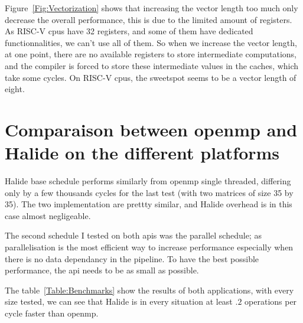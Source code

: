	Figure~\ref{Fig:Vectorization} shows that increasing the vector length too much only decrease the overall performance, this is due to the limited amount of registers. As RISC-V \glspl{cpu} have 32 registers, and some of them have dedicated functionnalities, we can't use all of them.
	So when we increase the vector length, at one point, there are no available registers to store intermediate computations, and the compiler is forced to store these intermediate values in the caches, which take some  cycles.
	On RISC-V \glspl{cpu}, the sweetspot seems to be a vector length of eight.







\section{Comparaison between \acrshort{openmp} and Halide on the different platforms}



	Halide base schedule performs similarly from \gls{openmp} single threaded, differing only by a few thousands cycles for the last test (with two matrices of size 35 by 35).
	The two implementation are prettty similar, and Halide overhead is in this case almost negligeable.

	The second schedule I tested on both \glspl{api} was the parallel schedule; as parallelisation is the most efficient way to increase performance especially when there is no data dependancy in the pipeline. To have the best possible performance, the \gls{api} needs to be as small as possible.

	The table~\ref{Table:Benchmarks} show the results of both applications, with every size tested, we can see that Halide is in every situation at least $.2$ operations per cycle faster than \gls{openmp}.


